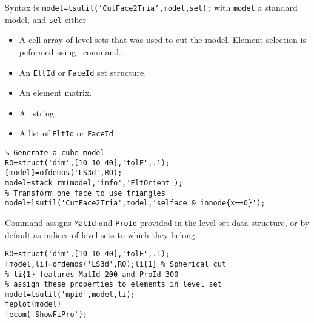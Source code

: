 Syntax is {\tt model=lsutil('CutFace2Tria',model,sel);} with {\tt model} a standard model, and {\tt sel} either
\begin{itemize}
\item A cell-array of level sets that was used to cut the model. Element selection is peformed using~ command.
\item An {\tt EltId} or {\tt FaceId} set structure.
\item An element matrix.
\item A~ string
\item A list of {\tt EltId} or {\tt FaceId}
\end{itemize}

\begin{verbatim}
% Generate a cube model
RO=struct('dim',[10 10 40],'tolE',.1);
[model]=ofdemos('LS3d',RO); 
model=stack_rm(model,'info','EltOrient');
% Transform one face to use triangles
model=lsutil('CutFace2Tria',model,'selface & innode{x==0}');
\end{verbatim}%



Command  assigns {\tt MatId} and {\tt ProId} provided in the level set data structure, or by default as indices of level sets to which they belong.

\begin{verbatim}
RO=struct('dim',[10 10 40],'tolE',.1);
[model,li]=ofdemos('LS3d',RO);li{1} % Spherical cut
% li{1} features MatId 200 and ProId 300
% assign these properties to elements in level set
model=lsutil('mpid',model,li);
feplot(model)
fecom('ShowFiPro');
\end{verbatim}%







\noindent \feplot 
